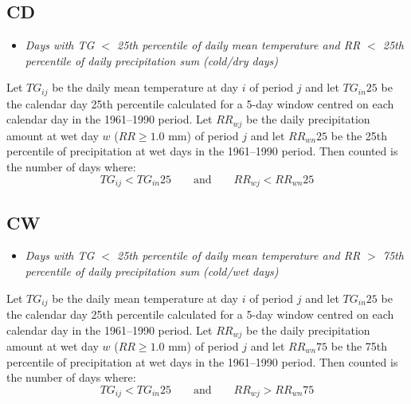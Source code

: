 \documentclass[a4paper,11pt]{article}
\begin{document}
\subsection*{CD}
\begin{itemize}
\item \textit{Days with TG $<$ 25th percentile of daily mean temperature 
and RR $<$ 25th percentile of daily precipitation sum (cold/dry days)}
\end{itemize}
Let $TG_{ij}$ be the daily mean temperature at day $i$ of period $j$
and let $TG_{in}25$ be the calendar day 25th percentile calculated for
a 5-day window centred on each calendar day in the 1961--1990
period. Let $RR_{wj}$ be the daily precipitation amount at wet day $w$
($RR\geq1.0$ mm) of period $j$ and let $RR_{wn}25$ be the 25th
percentile of precipitation at wet days in the 1961--1990 period. Then
counted is the number of days where:
\begin{equation*}
TG_{ij} < TG_{in}25 \qquad \textrm{and} \qquad RR_{wj} < RR_{wn}25
\end{equation*}

\subsection*{CW}
\begin{itemize}
\item \textit{Days with TG $<$ 25th percentile of daily mean temperature
and RR $>$ 75th percentile of daily precipitation sum (cold/wet days)}
\end{itemize}
Let $TG_{ij}$ be the daily mean temperature at day $i$ of period $j$
and let $TG_{in}25$ be the calendar day 25th percentile calculated for
a 5-day window centred on each calendar day in the 1961--1990
period. Let $RR_{wj}$ be the daily precipitation amount at wet day $w$
($RR\geq1.0$ mm) of period $j$ and let $RR_{wn}75$ be the 75th
percentile of precipitation at wet days in the 1961--1990 period. Then
counted is the number of days where:
\begin{equation*}
TG_{ij} < TG_{in}25 \qquad \textrm{and} \qquad RR_{wj} > RR_{wn}75
\end{equation*}
\end{document}
